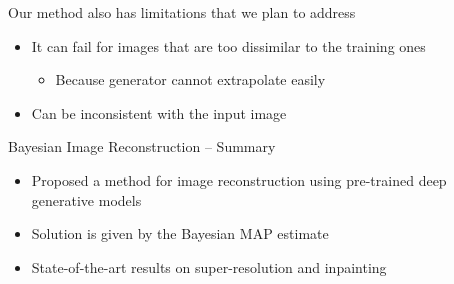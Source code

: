 \begin{frame}{Our method also has limitations that we plan to address}

\begin{itemize}
 \item It can fail for images that are too dissimilar to the training ones
 \begin{itemize}
 \item Because generator cannot extrapolate easily
 \end{itemize}
 \begin{center}
 \end{center}
 
 \item Can be inconsistent with the input image
 \begin{center}
 \end{center}
 
\end{itemize}
 
\end{frame}


\begin{frame}{Bayesian Image Reconstruction -- Summary}
 
 \begin{itemize}
  \item Proposed a method for image reconstruction using pre-trained deep generative models
  
  \vt
  
  \item Solution is given by the Bayesian MAP estimate
  
  \vt
  
  \item State-of-the-art results on super-resolution and inpainting
  
 \end{itemize}

 
\end{frame}




